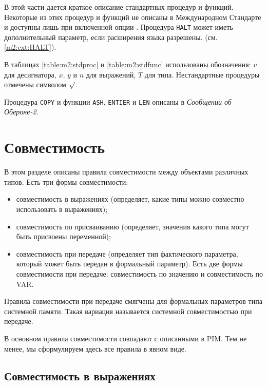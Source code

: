 В этой части дается краткое описание стандартных процедур и функций.
Некоторые из этих процедур и функций не описаны в
Международном Стандарте и доступны лишь при включенной опции
.
Процедура {\tt HALT} может иметь дополнительный параметр,
если расширения языка разрешены.
(см. \ref{m2:ext:HALT}).

В таблицах \ref{table:m2:stdproc} и
\ref{table:m2:stdfunc} использованы обозначения: $v$ для десигнатора,
$x$, $y$ и $n$ для выражений, $T$ для типа.
Нестандартные процедуры отмечены символом $\surd$.

Процедура {\tt COPY} и функции {\tt ASH}, {\tt ENTIER} и
{\tt LEN} описаны в {\em Сообщении об Обероне-2}.      %

\section{Совместимость}\label{m2:ISO:comp}

В этом разделе описаны правила совместимости между объектами 
различных типов. Есть три формы совместимости:
\begin{itemize}
\item совместимость в выражениях (определяет, какие типы можно
совместно использовать в выражениях);
\item совместимость по присваиванию (определяет, значения какого
типа могут быть присвоены переменной);
\item совместимость при передаче (определяет тип фактического параметра,
который может быть передан в формальный параметр).
Есть две формы совместимости при передаче: совместимость по значению
и совместимость по VAR. %
\end{itemize}
Правила совместимости при передаче смягчены для формальных
параметров типа системной памяти. 
Такая вариация называется системной 
совместимостью при передаче.

В основном правила совместимости совпадают с описанными в
PIM. Тем не менее, мы сформулируем здесь все правила в явном виде.

\subsection{Совместимость в выражениях}\label{m2:ISO:comp:expr}

